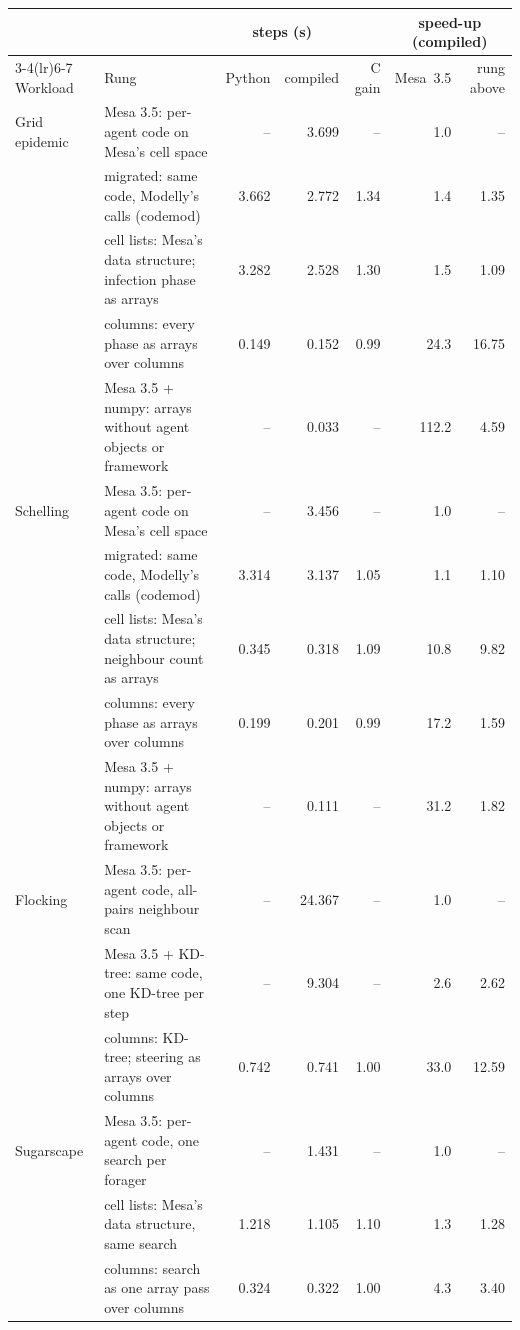 \begin{tabularx}{\linewidth}{l>{\raggedright\arraybackslash}Xrrrrr}
\toprule
 & & \multicolumn{2}{c}{steps (s)} & & \multicolumn{2}{c}{speed-up (compiled)} \\
\cmidrule(lr){3-4}\cmidrule(lr){6-7}
Workload & Rung & Python & compiled & C gain & Mesa~3.5 & rung above \\
\midrule
Grid epidemic & Mesa 3.5: per-agent code on Mesa's cell space & -- & 3.699 & -- & 1.0 & -- \\
 & migrated: same code, Modelly's calls (codemod) & 3.662 & 2.772 & 1.34 & 1.4 & 1.35 \\
 & cell lists: Mesa's data structure; infection phase as arrays & 3.282 & 2.528 & 1.30 & 1.5 & 1.09 \\
 & columns: every phase as arrays over columns & 0.149 & 0.152 & 0.99 & 24.3 & 16.75 \\
 & Mesa 3.5 + numpy: arrays without agent objects or framework & -- & 0.033 & -- & 112.2 & 4.59 \\
\addlinespace
Schelling & Mesa 3.5: per-agent code on Mesa's cell space & -- & 3.456 & -- & 1.0 & -- \\
 & migrated: same code, Modelly's calls (codemod) & 3.314 & 3.137 & 1.05 & 1.1 & 1.10 \\
 & cell lists: Mesa's data structure; neighbour count as arrays & 0.345 & 0.318 & 1.09 & 10.8 & 9.82 \\
 & columns: every phase as arrays over columns & 0.199 & 0.201 & 0.99 & 17.2 & 1.59 \\
 & Mesa 3.5 + numpy: arrays without agent objects or framework & -- & 0.111 & -- & 31.2 & 1.82 \\
\addlinespace
Flocking & Mesa 3.5: per-agent code, all-pairs neighbour scan & -- & 24.367 & -- & 1.0 & -- \\
 & Mesa 3.5 + KD-tree: same code, one KD-tree per step & -- & 9.304 & -- & 2.6 & 2.62 \\
 & columns: KD-tree; steering as arrays over columns & 0.742 & 0.741 & 1.00 & 33.0 & 12.59 \\
\addlinespace
Sugarscape & Mesa 3.5: per-agent code, one search per forager & -- & 1.431 & -- & 1.0 & -- \\
 & cell lists: Mesa's data structure, same search & 1.218 & 1.105 & 1.10 & 1.3 & 1.28 \\
 & columns: search as one array pass over columns & 0.324 & 0.322 & 1.00 & 4.3 & 3.40 \\
\bottomrule
\end{tabularx}
